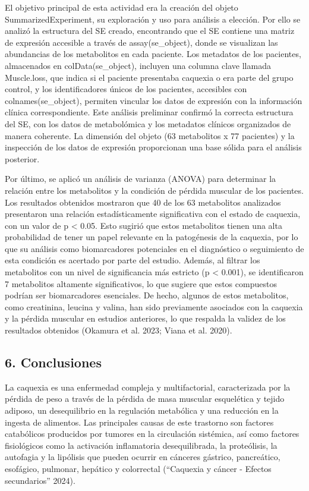 \documentclass[
]{article}
\begin{document}
El objetivo principal de esta actividad era la creación del objeto
SummarizedExperiment, su exploración y uso para análisis a elección. Por
ello se analizó la estructura del SE creado, encontrando que el SE
contiene una matriz de expresión accesible a través de
assay(se\_object), donde se visualizan las abundancias de los
metabolitos en cada paciente. Los metadatos de los pacientes,
almacenados en colData(se\_object), incluyen una columna clave llamada
Muscle.loss, que indica si el paciente presentaba caquexia o era parte
del grupo control, y los identificadores únicos de los pacientes,
accesibles con colnames(se\_object), permiten vincular los datos de
expresión con la información clínica correspondiente. Este análisis
preliminar confirmó la correcta estructura del SE, con los datos de
metabolómica y los metadatos clínicos organizados de manera coherente.
La dimensión del objeto (63 metabolitos x 77 pacientes) y la inspección
de los datos de expresión proporcionan una base sólida para el análisis
posterior.

Por último, se aplicó un análisis de varianza (ANOVA) para determinar la
relación entre los metabolitos y la condición de pérdida muscular de los
pacientes. Los resultados obtenidos mostraron que 40 de los 63
metabolitos analizados presentaron una relación estadísticamente
significativa con el estado de caquexia, con un valor de p \textless{}
0.05. Esto sugirió que estos metabolitos tienen una alta probabilidad de
tener un papel relevante en la patogénesis de la caquexia, por lo que su
análisis como biomarcadores potenciales en el diagnóstico o seguimiento
de esta condición es acertado por parte del estudio. Además, al filtrar
los metabolitos con un nivel de significancia más estricto (p
\textless{} 0.001), se identificaron 7 metabolitos altamente
significativos, lo que sugiere que estos compuestos podrían ser
biomarcadores esenciales. De hecho, algunos de estos metabolitos, como
creatinina, leucina y valina, han sido previamente asociados con la
caquexia y la pérdida muscular en estudios anteriores, lo que respalda
la validez de los resultados obtenidos (Okamura et al. 2023; Viana et
al. 2020).

\subsection{6. Conclusiones}\label{conclusiones}

La caquexia es una enfermedad compleja y multifactorial, caracterizada
por la pérdida de peso a través de la pérdida de masa muscular
esquelética y tejido adiposo, un desequilibrio en la regulación
metabólica y una reducción en la ingesta de alimentos. Las principales
causas de este trastorno son factores catabólicos producidos por tumores
en la circulación sistémica, así como factores fisiológicos como la
activación inflamatoria desequilibrada, la proteólisis, la autofagia y
la lipólisis que pueden ocurrir en cánceres gástrico, pancreático,
esofágico, pulmonar, hepático y colorrectal ({``{Caquexia y c{á}ncer -
Efectos secundarios}''} 2024).
\end{document}
